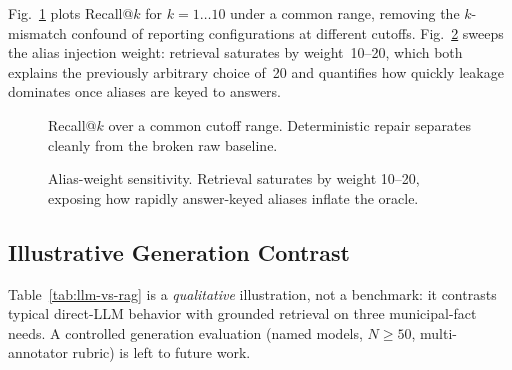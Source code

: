 \documentclass[conference]{IEEEtran}
\begin{document}
Fig.~\ref{fig:recall} plots Recall@$k$ for $k{=}1\ldots10$ under a common range, removing the $k$-mismatch confound of reporting configurations at different cutoffs. Fig.~\ref{fig:alias} sweeps the alias injection weight: retrieval saturates by weight~10--20, which both explains the previously arbitrary choice of~20 and quantifies how quickly leakage dominates once aliases are keyed to answers.

\begin{figure}[t]
\centering
{}
\caption{Recall@$k$ over a common cutoff range. Deterministic repair separates cleanly from the broken raw baseline.}
\label{fig:recall}
\end{figure}

\begin{figure}[t]
\centering
{}
\caption{Alias-weight sensitivity. Retrieval saturates by weight 10--20, exposing how rapidly answer-keyed aliases inflate the oracle.}
\label{fig:alias}
\end{figure}

\subsection{Illustrative Generation Contrast}
\label{sec:llm-vs-rag}
Table~\ref{tab:llm-vs-rag} is a \emph{qualitative} illustration, not a benchmark: it contrasts typical direct-LLM behavior with grounded retrieval on three municipal-fact needs. A controlled generation evaluation (named models, $N\!\geq\!50$, multi-annotator rubric) is left to future work.
\end{document}
